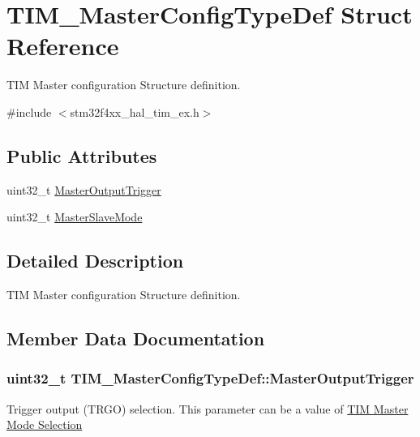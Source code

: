 \hypertarget{struct_t_i_m___master_config_type_def}{}\section{T\+I\+M\+\_\+\+Master\+Config\+Type\+Def Struct Reference}
\label{struct_t_i_m___master_config_type_def}


T\+IM Master configuration Structure definition.  




{\ttfamily \#include $<$stm32f4xx\+\_\+hal\+\_\+tim\+\_\+ex.\+h$>$}

\subsection*{Public Attributes}
\begin{DoxyCompactItemize}
\item 
uint32\+\_\+t \hyperlink{struct_t_i_m___master_config_type_def_a908a6c1b46cb203c0b8b59b490e1114e}{Master\+Output\+Trigger}
\item 
uint32\+\_\+t \hyperlink{struct_t_i_m___master_config_type_def_a45ddfca310a1180e19fc24b36f8e9585}{Master\+Slave\+Mode}
\end{DoxyCompactItemize}


\subsection{Detailed Description}
T\+IM Master configuration Structure definition. 

\subsection{Member Data Documentation}
\subsubsection[{\texorpdfstring{Master\+Output\+Trigger}{MasterOutputTrigger}}]{\setlength{\rightskip}{0pt plus 5cm}uint32\+\_\+t T\+I\+M\+\_\+\+Master\+Config\+Type\+Def\+::\+Master\+Output\+Trigger}\hypertarget{struct_t_i_m___master_config_type_def_a908a6c1b46cb203c0b8b59b490e1114e}{}\label{struct_t_i_m___master_config_type_def_a908a6c1b46cb203c0b8b59b490e1114e}
Trigger output (T\+R\+GO) selection. This parameter can be a value of \hyperlink{group___t_i_m___master___mode___selection}{T\+IM Master Mode Selection} 
